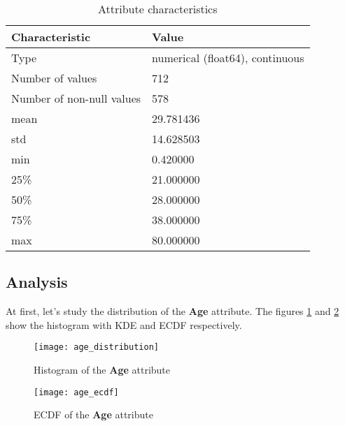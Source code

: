 \begin{table}[!hp]
    \centering
    \caption{Attribute characteristics}
    \begin{tabular}{|l|l|}
        \hline
        \textbf{Characteristic}   & \textbf{Value}                  \\ \hline
        Type                      & numerical (float64), continuous \\ \hline
        Number of values          & 712                             \\ \hline
        Number of non-null values & 578                             \\ \hline
        mean                      & 29.781436                       \\ \hline
        std                       & 14.628503                       \\ \hline
        min                       & 0.420000                        \\ \hline
        25\%                      & 21.000000                       \\ \hline
        50\%                      & 28.000000                       \\ \hline
        75\%                      & 38.000000                       \\ \hline
        max                       & 80.000000                       \\ \hline
    \end{tabular}
    \label{table:age_characteristics}
\end{table}

\subsection{Analysis}
At first, let's study the distribution of the \textbf{Age} attribute.
The figures \ref{pic:age_distribution} and \ref{pic:age_ecdf} show the 
histogram with KDE and ECDF respectively.

\begin{figure}[!hp]
    \centering
    \texttt{[image: age\_distribution]}
    \caption{Histogram of the \textbf{Age} attribute}
    \label{pic:age_distribution}
\end{figure}

\begin{figure}[!hp]
    \centering
    \texttt{[image: age\_ecdf]}
    \caption{ECDF of the \textbf{Age} attribute}
    \label{pic:age_ecdf}
\end{figure}

